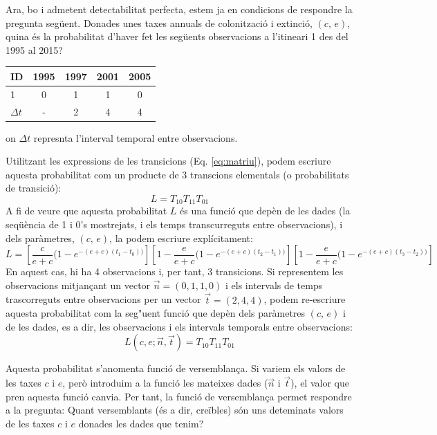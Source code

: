 \documentclass{article}
\begin{document}
Ara, bo i admetent detectabilitat perfecta, estem ja en condicions de respondre la pregunta seg\"uent. Donades unes taxes annuals de colonitzaci\'o i extinci\'o, $(c,\,e)$, quina \'es la probabilitat d'haver fet les seg\"uents observacions a l'itineari 1 des del 1995 al 2015? 

\begin{center}
    \centering
    \begin{tabular}{l|c|c|c|c}
         ID      & 1995 & 1997 & 2001 & 2005 \\
         \hline
         1       &  0   &   1  &   1  &   0     \\
         \hline
         $\Delta t$ & - & 2 & 4 & 4   
    \end{tabular}
\end{center}
on $\Delta t$ represnta l'interval temporal entre observacions. 
\smallskip

Utilitzant les expressions de les transicions (Eq. \ref{eq:matriu}), podem escriure aquesta probabilitat com un producte de 3 transcions elementals (o probabilitats de transici\'o): 
\begin{equation}
    L = T_{10}T_{11}T_{01}
\end{equation}
A fi de veure que aquesta probabilitat $L$ \'es una funci\'o que dep\`en de les dades (la seq\"u\`encia de 1 i 0's mostrejats, i els temps transcurreguts entre observacions), i dels par\`ametres, $(c,\,e)$, la podem escriure expl\'icitament:
\begin{equation}
    L =  \left[\frac{c}{e+c} ( 1 - e^{-(e+c)(t_1-t_0))}\right] \left[1 - \frac{e}{e+c} ( 1 - e^{-(e+c)(t_2-t_1))} \right] \left[1 - \frac{e}{e+c} ( 1 - e^{-(e+c)(t_3-t_2))} \right] 
\end{equation}
En aquest cas, hi ha 4 observacions i, per tant, 3 transicions. Si representem les observacions mitjan\c{c}ant un vector $\vec{n} = (0, 1, 1, 0)$ i els intervals de temps trascorreguts entre observacions per un vector $\vec{t} = (2, 4, 4)$, podem re-escriure aquesta probabilitat com la seg"uent funci\'o que dep\`en dels par\`ametres $(c,\,e)$ i de les dades, es a dir, les observacions i els intervals temporals entre observacions: 
\begin{equation}
    L(c, e; \vec{n}, \vec{t}) = T_{10}T_{11}T_{01}
    \label{eq:versembla}
\end{equation}

Aquesta probabilitat s'anomenta funci\'o de versemblan\c{c}a. Si variem els valors de les taxes $c$ i $e$, per\`o introduim a la funci\'o les mateixes dades ($\vec{n}$ i $\vec{t}$), el valor que pren aquesta funci\'o canvia.  Per tant, la funci\'o de versemblan\c{c}a permet respondre a la pregunta: Quant versemblants (\'es a dir, cre\"ibles) s\'on uns deteminats valors de les taxes $c$ i $e$ donades les dades que tenim? 
\smallskip
\end{document}
